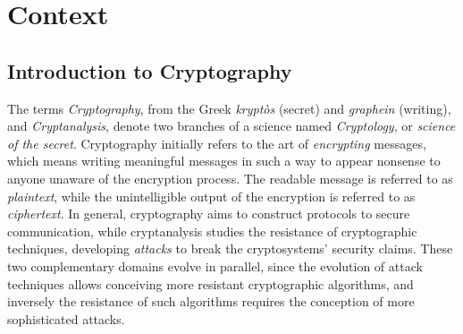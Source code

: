 
\chapter{Context} %

\label{ChapterIntroduction}


\section{Introduction to Cryptography}
The terms \emph{Cryptography}, from the Greek \emph{krypt\`os} (secret) and \emph{graphein} (writing), and \emph{Cryptanalysis}, denote two branches of a science named \emph{Cryptology}, or \emph{science of the secret}. Cryptography initially refers to the art of \emph{encrypting} messages, which means writing meaningful messages in such a way to appear nonsense to anyone unaware of the encryption process. The readable message is referred to as \emph{plaintext}, while the unintelligible output of the encryption is referred to as \emph{ciphertext}. In general, cryptography aims to construct protocols to secure communication, while cryptanalysis studies the resistance of cryptographic techniques, developing \emph{attacks} to break the cryptosystems' security claims. These two complementary domains evolve in parallel, since the evolution of attack techniques allows conceiving more resistant cryptographic algorithms, and inversely the resistance of such algorithms requires the conception of more sophisticated attacks.\\

